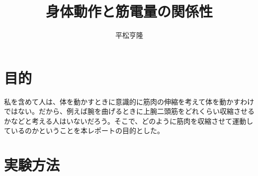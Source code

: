 \documentclass{jsarticle}
\begin{document}
\title{身体動作と筋電量の関係性}
\author{平松亨隆}
\maketitle


\section{目的}
私を含めて人は、体を動かすときに意識的に筋肉の伸縮を考えて体を動かすわけではない。だから、例えば腕を曲げるときに上腕二頭筋をどれくらい収縮させるかなどと考える人はいないだろう。そこで、どのように筋肉を収縮させて運動しているのかということを本レポートの目的とした。

\section{実験方法}
\end{document}
